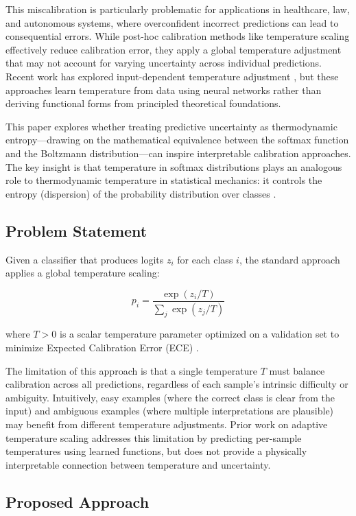 \documentclass[11pt,letterpaper]{article}
\begin{document}
This miscalibration is particularly problematic for applications in healthcare, law, and autonomous systems, where overconfident incorrect predictions can lead to consequential errors. While post-hoc calibration methods like temperature scaling \cite{Guo2017} effectively reduce calibration error, they apply a global temperature adjustment that may not account for varying uncertainty across individual predictions. Recent work has explored input-dependent temperature adjustment \cite{Joy2023, Tomani2021, Xie2024}, but these approaches learn temperature from data using neural networks rather than deriving functional forms from principled theoretical foundations.

This paper explores whether treating predictive uncertainty as thermodynamic entropy---drawing on the mathematical equivalence between the softmax function and the Boltzmann distribution---can inspire interpretable calibration approaches. The key insight is that temperature in softmax distributions plays an analogous role to thermodynamic temperature in statistical mechanics: it controls the entropy (dispersion) of the probability distribution over classes \cite{PhysicsSE2023, TowardsAI2023}.

\subsection{Problem Statement}

Given a classifier that produces logits $z_i$ for each class $i$, the standard approach applies a global temperature scaling:

$$p_i = \frac{\exp(z_i / T)}{\sum_j \exp(z_j / T)}$$

where $T > 0$ is a scalar temperature parameter optimized on a validation set to minimize Expected Calibration Error (ECE) \cite{Guo2017}.

The limitation of this approach is that a single temperature $T$ must balance calibration across all predictions, regardless of each sample's intrinsic difficulty or ambiguity. Intuitively, easy examples (where the correct class is clear from the input) and ambiguous examples (where multiple interpretations are plausible) may benefit from different temperature adjustments. Prior work on adaptive temperature scaling \cite{Joy2023, Xie2024} addresses this limitation by predicting per-sample temperatures using learned functions, but does not provide a physically interpretable connection between temperature and uncertainty.

\subsection{Proposed Approach}
\end{document}
